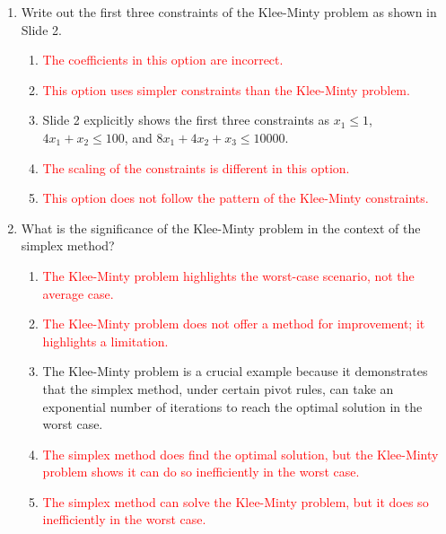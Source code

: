 \documentclass{article}%
\newcommand{\incorrect}[1]{\textcolor{red}{#1}}
\begin{document}
\begin{enumerate}
\begin{enumerate}
\begin{enumerate}
\item \incorrect{This objective function has the powers of 2 in a different order than the Klee-Minty problem.}%
\end{enumerate}%
\vspace{0.5em}%
\item Write out the first three constraints of the Klee-Minty problem as shown in Slide 2.%
\begin{enumerate}%
\item \incorrect{The coefficients in this option are incorrect.}%
\item \incorrect{This option uses simpler constraints than the Klee-Minty problem.}%
\item Slide 2 explicitly shows the first three constraints as $x_1 \le 1$, $4x_1 + x_2 \le 100$, and $8x_1 + 4x_2 + x_3 \le 10000$.%
\item \incorrect{The scaling of the constraints is different in this option.}%
\item \incorrect{This option does not follow the pattern of the Klee-Minty constraints.}%
\end{enumerate}%
\vspace{0.5em}%
\item What is the significance of the Klee-Minty problem in the context of the simplex method?%
\begin{enumerate}%
\item \incorrect{The Klee-Minty problem highlights the worst-case scenario, not the average case.}%
\item \incorrect{The Klee-Minty problem does not offer a method for improvement; it highlights a limitation.}%
\item The Klee-Minty problem is a crucial example because it demonstrates that the simplex method, under certain pivot rules, can take an exponential number of iterations to reach the optimal solution in the worst case.%
\item \incorrect{The simplex method does find the optimal solution, but the Klee-Minty problem shows it can do so inefficiently in the worst case.}%
\item \incorrect{The simplex method can solve the Klee-Minty problem, but it does so inefficiently in the worst case.}%
\end{enumerate}%
\vspace{0.5em}%
\end{enumerate}%
\end{enumerate}

%
\end{document}

